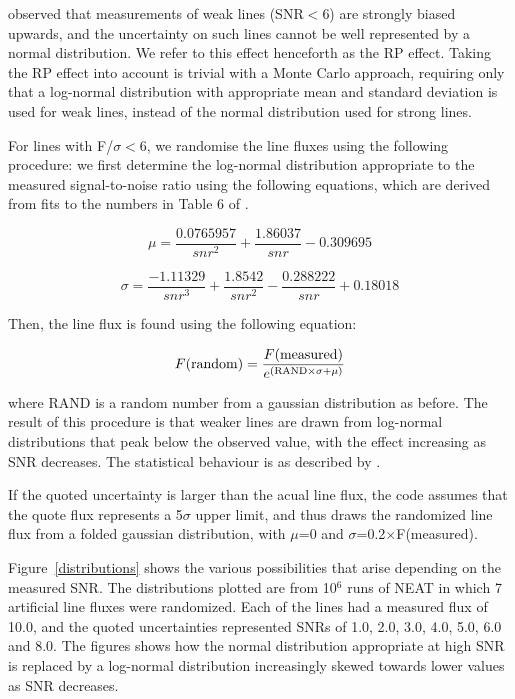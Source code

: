 \documentclass[useAMS,usenatbib]{mn2e}
\begin{document}

\citet{1994A&A...287..676R} observed that measurements of weak lines (SNR$<$6) are strongly biased upwards, and the uncertainty on such lines cannot be well represented by a normal distribution.  We refer to this effect henceforth as the RP effect.  Taking the RP effect into account is trivial with a Monte Carlo approach, requiring only that a log-normal distribution with appropriate mean and standard deviation is used for weak lines, instead of the normal distribution used for strong lines.

For lines with F/$\sigma < $6, we randomise the line fluxes using the following procedure: we first determine the log-normal distribution appropriate to the measured signal-to-noise ratio using the following equations, which are derived from fits to the numbers in Table 6 of \citet{1994A&A...287..676R}.

\begin{equation}
\mu = \frac{0.0765957}{snr^2} + \frac{1.86037}{snr} - 0.309695
\end{equation}

\begin{equation}
\sigma = \frac{-1.11329}{snr^3} + \frac{1.8542}{snr^2} - \frac{0.288222}{snr} + 0.18018
\end{equation}

Then, the line flux is found using the following equation:

\begin{equation}
F({\rm random}) = \frac{F({\rm measured})}{e^{({\rm RAND}\times\sigma + \mu)}}
\end{equation}

where RAND is a random number from a gaussian distribution as before.  The result of this procedure is that weaker lines are drawn from log-normal distributions that peak below the observed value, with the effect increasing as SNR decreases.  The statistical behaviour is as described by \citet{1994A&A...287..676R}.

If the quoted uncertainty is larger than the acual line flux, the code assumes that the quote flux represents a 5$\sigma$ upper limit, and thus draws the randomized line flux from a folded gaussian distribution, with $\mu$=0 and $\sigma$=0.2$\times$F(measured).

Figure~\ref{distributions} shows the various possibilities that arise depending on the measured SNR.  The distributions plotted are from 10$^6$ runs of NEAT in which 7 artificial line fluxes were randomized.  Each of the lines had a measured flux of 10.0, and the quoted uncertainties represented SNRs of 1.0, 2.0, 3.0, 4.0, 5.0, 6.0 and 8.0.  The figures shows how the normal distribution appropriate at high SNR is replaced by a log-normal distribution increasingly skewed towards lower values as SNR decreases.
\end{document}
